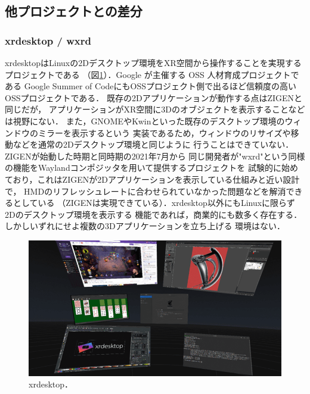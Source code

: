 \subsection{他プロジェクトとの差分}
\label{section:project-uniqueness}

\subsubsection{xrdesktop / wxrd}

xrdesktopはLinuxの2Dデスクトップ環境をXR空間から操作することを実現するプロジェクトである
（図\ref{fig:xrdesktop}）．Google が主催する OSS 人材育成プロジェクトである
Google Summer of CodeにもOSSプロジェクト側で出るほど信頼度の高いOSSプロジェクトである．
既存の2Dアプリケーションが動作する点はZIGENと同じだが，
アプリケーションがXR空間に3Dのオブジェクトを表示することなどは視野にない．
また，GNOMEやKwinといった既存のデスクトップ環境のウィンドウのミラーを表示するという
実装であるため，ウィンドウのリサイズや移動などを通常の2Dデスクトップ環境と同じように
行うことはできていない．ZIGENが始動した時期と同時期の2021年7月から
同じ開発者が"wxrd"という同様の機能をWaylandコンポジッタを用いて提供するプロジェクトを
試験的に始めており，これはZIGENが2Dアプリケーションを表示している仕組みと近い設計で，
HMDのリフレッシュレートに合わせられていなかった問題などを解消できるとしている
（ZIGENは実現できている）．xrdesktop以外にもLinuxに限らず2Dのデスクトップ環境を表示する
機能であれば，商業的にも数多く存在する．しかしいずれにせよ複数の3Dアプリケーションを立ち上げる
環境はない．

\begin{figure}[htbp]
  \begin{minipage}[t]{0.50\linewidth}
    \centering
    \includegraphics[keepaspectratio, width=\linewidth]{fig/xrdesktop.png}
    \caption{xrdesktop．}
    \label{fig:xrdesktop}
  \end{minipage}
\end{figure}

